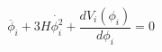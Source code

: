 \begin{equation}
\label{2E}
\ddot{\phi _i}+3H\dot{\phi _i^2}+\frac{dV_i(\phi _i)}{d\phi _i}=0
\end{equation}

